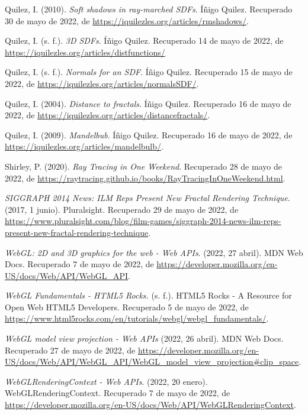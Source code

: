 \begin{thebibliography}{99}
     Quilez, I. (2010). \textit{Soft shadows in ray-marched SDFs}. Íñigo Quilez. Recuperado 30 de mayo de 2022, de \url{https://iquilezles.org/articles/rmshadows/}.

     Quilez, I. (s. f.). \textit{3D SDFs}. Íñigo Quilez. Recuperado 14 de mayo de 2022, de \url{https://iquilezles.org/articles/distfunctions/}


     Quilez, I. (s. f.). \textit{Normals for an SDF}. Íñigo Quilez. Recuperado 15 de mayo de 2022, de \url{https://iquilezles.org/articles/normalsSDF/}.

     Quilez, I. (2004). \textit{Distance to fractals}. Íñigo Quilez. Recuperado 16 de mayo de 2022, de \url{https://iquilezles.org/articles/distancefractals/}.

     Quilez, I. (2009). \textit{Mandelbub}. Íñigo Quilez. Recuperado 16 de mayo de 2022, de \url{https://iquilezles.org/articles/mandelbulb/}.

     Shirley, P. (2020). \textit{Ray Tracing in One Weekend}. Recuperado 28 de mayo de 2022, de \url{https://raytracing.github.io/books/RayTracingInOneWeekend.html}.

     \textit{SIGGRAPH 2014 News: ILM Reps Present New Fractal Rendering Technique}. (2017, 1 junio). Pluralsight. Recuperado 29 de mayo de 2022, de \url{https://www.pluralsight.com/blog/film-games/siggraph-2014-news-ilm-reps-present-new-fractal-rendering-technique}.

     \textit{WebGL: 2D and 3D graphics for the web - Web APIs}. (2022, 27 abril). MDN Web Docs. Recuperado 7 de mayo de 2022, de \url{https://developer.mozilla.org/en-US/docs/Web/API/WebGL_API}.

     \textit{WebGL Fundamentals - HTML5 Rocks.} (s. f.). HTML5 Rocks - A Resource for Open Web HTML5 Developers. Recuperado 5 de mayo de 2022, de \url{https://www.html5rocks.com/en/tutorials/webgl/webgl_fundamentals/}.

     \textit{WebGL model view projection - Web APIs} (2022, 26 abril). MDN Web Docs. Recuperado 27 de mayo de 2022, de \url{https://developer.mozilla.org/en-US/docs/Web/API/WebGL_API/WebGL_model_view_projection#clip_space}.

     \textit{WebGLRenderingContext - Web APIs}. (2022, 20 enero). WebGLRenderingContext. Recuperado 7 de mayo de 2022, de \url{https://developer.mozilla.org/en-US/docs/Web/API/WebGLRenderingContext}.


\end{thebibliography}
